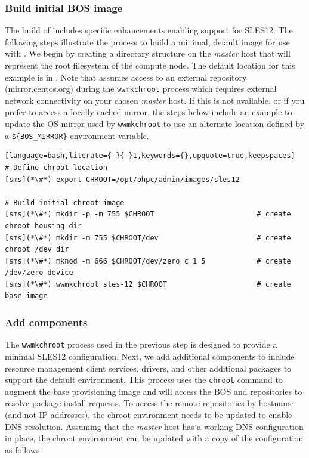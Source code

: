 \documentclass[letterpaper]{article}
\newcommand{\baseOS}{SLES12}
\begin{document}
\subsubsection{Build initial BOS image} \label{sec:assemble_bos}

The \OHPC{} build of \Warewulf{} includes specific enhancements enabling support for
\baseOS{}. The following steps illustrate the process to build a minimal, default
image for use with \Warewulf{}. We begin by creating a directory structure on the 
{\em master} host that will represent the root filesystem of the compute node. The 
default location for this example is in
. Note that \Warewulf{} assumes access to
an external repository (mirror.centos.org) during the \texttt{wwmkchroot}
process which requires external network connectivity on your chosen {\em
 master} host. If this is not available, or if you prefer to access a locally cached
mirror, the steps below include an example to update the OS mirror used by
\texttt{wwmkchroot} to use an alternate location defined by a
\texttt{\$\{BOS\_MIRROR\}} environment variable.

\begin{lstlisting}[language=bash,literate={-}{-}1,keywords={},upquote=true,keepspaces]
# Define chroot location
[sms](*\#*) export CHROOT=/opt/ohpc/admin/images/sles12

# Build initial chroot image
[sms](*\#*) mkdir -p -m 755 $CHROOT                        # create chroot housing dir
[sms](*\#*) mkdir -m 755 $CHROOT/dev                       # create chroot /dev dir
[sms](*\#*) mknod -m 666 $CHROOT/dev/zero c 1 5            # create /dev/zero device
[sms](*\#*) wwmkchroot sles-12 $CHROOT                     # create base image
\end{lstlisting}

\subsubsection{Add \OHPC{} components} \label{sec:add_components}

The \texttt{wwmkchroot} process used in the previous step is designed to
provide a minimal \baseOS{} configuration. Next, we add additional components to
include resource management client services, \InfiniBand{} drivers, and other
additional packages to support the default \OHPC{} environment. This process uses
the \texttt{chroot} command to augment the base provisioning image and will
access the BOS and \OHPC{} repositories to resolve package install requests. To
access the remote repositories by hostname (and not IP addresses), the chroot
environment needs to be updated to enable DNS resolution. Assuming that
the {\em master} host has a working DNS configuration in place, the chroot environment can
be updated with a copy of the configuration as follows:
\end{document}
